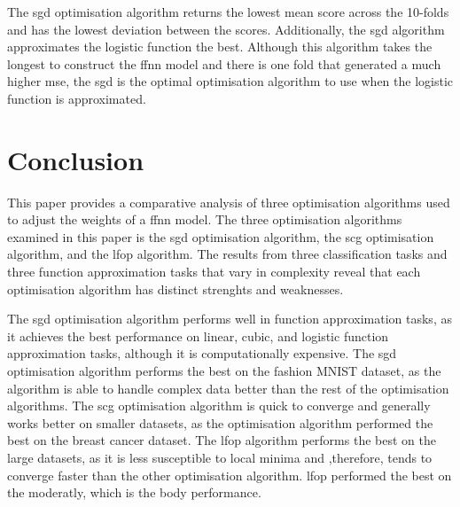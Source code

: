 \documentclass[10pt, conference]{IEEEtran}
\begin{document}
The \acrshort{sgd} optimisation algorithm returns the lowest mean score across the 10-folds and has
the lowest deviation between the scores. Additionally, the \acrshort{sgd} algorithm approximates the logistic
function the best. Although this algorithm takes the longest to construct the \acrshort{ffnn} model and there
is one fold that generated a much higher \acrshort{mse}, the \acrshort{sgd} is the optimal optimisation algorithm
to use when the logistic function is approximated.

\section{Conclusion} \label{section: Conclusion}

This paper provides a comparative analysis of three optimisation algorithms used
to adjust the weights of a \acrfull{ffnn} model. The three optimisation
algorithms examined in this paper is the \acrfull{sgd} optimisation algorithm,
the \acrfull{scg} optimisation algorithm, and the \acrfull{lfop} algorithm.
The results from three classification tasks and three function approximation
tasks that vary in complexity reveal that each optimisation algorithm has distinct
strenghts and weaknesses.

The \acrshort{sgd} optimisation algorithm performs well in function approximation tasks, as
it achieves the best performance on linear, cubic, and logistic function approximation
tasks, although it is computationally expensive. The \acrshort{sgd} optimisation
algorithm performs the best on the fashion MNIST dataset, as the algorithm is able to handle
complex data better than the rest of the optimisation algorithms. The \acrshort{scg} optimisation algorithm is
quick to converge and generally works better on smaller datasets, as the optimisation algorithm performed
the best on the breast cancer dataset. The \acrshort{lfop} algorithm
performs the best on the large datasets, as it is less susceptible to local minima and ,therefore,
tends to converge faster than the other optimisation algorithm. \acrshort{lfop} performed the best
on the moderatly, which is the body performance.
\end{document}
